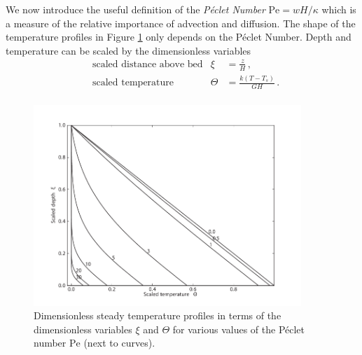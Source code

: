 \documentclass[11pt,a4paper,halfparskip]{scrartcl}
\begin{document}
We now introduce the useful definition of the \emph{P{\'e}clet Number} $\text{Pe}
= w H/\kappa$ which is a measure of the relative importance of advection
and diffusion.  The shape of the temperature profiles in Figure
\ref{fig:advection-diffusion} only depends on the P{\'e}clet Number.  Depth and
temperature can be scaled by the dimensionless variables
%
\begin{align*}
 &\text{scaled distance above bed} & \xi &= \frac{z}{H}\,,\\
 &\text{scaled temperature}        & \Theta &= \frac{k (T-T_s)}{G H}\,.\\
\end{align*}
%
\begin{figure}[tbhp]
 \centering
 \includegraphics[width=0.9\textwidth]{figures/advection-diffusion}
  \caption{Dimensionless steady temperature profiles in terms of the
    dimensionless variables $\xi$ and $\Theta$ for various values of the
    P{\'e}clet number $\mathrm{Pe}$ (next to curves). }
   \label{fig:advection-diffusion}
\end{figure}


\newpage

\end{document}
